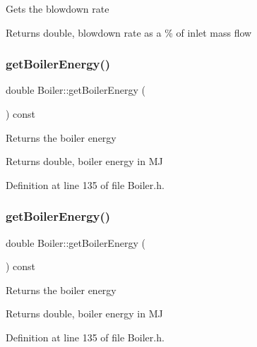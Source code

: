 Gets the blowdown rate \begin{DoxyReturn}{Returns}
double, blowdown rate as a \% of inlet mass flow 
\end{DoxyReturn}
\mbox{\label{class_boiler_a8cc9ad5f1b36f5dcbcb225e9e3d13a39}} 
\subsubsection{\texorpdfstring{get\+Boiler\+Energy()}{getBoilerEnergy()}\hspace{0.1cm}{\footnotesize\ttfamily [1/3]}}
{\footnotesize\ttfamily double Boiler\+::get\+Boiler\+Energy (\begin{DoxyParamCaption}{ }\end{DoxyParamCaption}) const\hspace{0.3cm}{\ttfamily [inline]}}

Returns the boiler energy \begin{DoxyReturn}{Returns}
double, boiler energy in MJ 
\end{DoxyReturn}


Definition at line 135 of file Boiler.\+h.

\mbox{\label{class_boiler_a8cc9ad5f1b36f5dcbcb225e9e3d13a39}} 
\subsubsection{\texorpdfstring{get\+Boiler\+Energy()}{getBoilerEnergy()}\hspace{0.1cm}{\footnotesize\ttfamily [2/3]}}
{\footnotesize\ttfamily double Boiler\+::get\+Boiler\+Energy (\begin{DoxyParamCaption}{ }\end{DoxyParamCaption}) const\hspace{0.3cm}{\ttfamily [inline]}}

Returns the boiler energy \begin{DoxyReturn}{Returns}
double, boiler energy in MJ 
\end{DoxyReturn}


Definition at line 135 of file Boiler.\+h.

\mbox{\label{class_boiler_a8cc9ad5f1b36f5dcbcb225e9e3d13a39}} 
